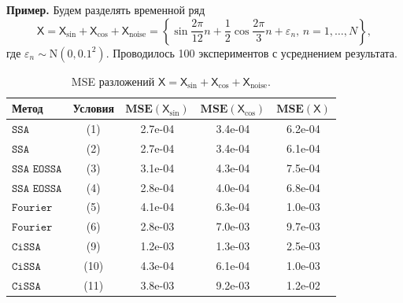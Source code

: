\documentclass[12pt, specialist, subf
]{disser}
\theoremstyle{definition}
\newcommand{\SSA}{\texttt{SSA}}
\newcommand{\EOSSA}{\texttt{SSA EOSSA}}
\newcommand{\CISSA}{\texttt{CiSSA}}
\newcommand{\FOURIER}{\texttt{Fourier}}
\newcommand{\TS}{\mathsf{X}}
\newcommand{\MSE}{\textbf{MSE}}
\begin{document}
\textbf{\large{Пример.}} Будем разделять временной ряд 
\[
\TS = \TS_{\sin} + \TS_{\cos} + \TS_{\mathrm{noise}} =  \left\{ \sin{\frac{2\pi}{12}n} + \frac{1}{2}\cos{\frac{2\pi}{3}n}+ \varepsilon_n, \, n = 1, \dots, N \right\},
\]
где $\varepsilon_n \sim \mathrm N(0, 0.1^2)$. Проводилось 100 экспериментов с усреднением результата.

\begin{table}[H]
\centering
\caption{MSE разложений \(\TS = \TS_{\sin} + \TS_{\cos}+ \TS_{\mathrm{noise}}\).}
\label{tab:exact_noised_results}
\begin{tabular}{l|c|ccc}
  \hline
  \textbf{Метод} & \textbf{Условия} & \(\MSE(\TS_{\sin})\) & \(\MSE(\TS_{\cos})\) & \(\MSE(\TS)\) \\ 
  \hline
  $\SSA$    & (1) & 2.7e-04 & 3.4e-04 & 6.2e-04 \\ 
  $\SSA$    & (2) & 2.7e-04 & 3.4e-04 & 6.1e-04 \\ 
  \hline
  $\EOSSA$  & (3) & 3.1e-04 & 4.3e-04 & 7.5e-04 \\ 
  $\EOSSA$  & (4) & 2.8e-04 & 4.0e-04 & 6.8e-04 \\ 
  \hline
  $\FOURIER$    & (5) & 4.1e-04 & 6.3e-04 & 1.0e-03 \\ 
  $\FOURIER$ & (6) & 2.8e-03 & 7.0e-03 & 9.7e-03 \\ 
  \hline
  $\CISSA$  & (9) & 1.2e-03 & 1.3e-03 & 2.5e-03 \\ 
  $\CISSA$ & (10) & 4.3e-04 & 6.1e-04 & 1.0e-03 \\ 
  $\CISSA$ & (11) & 3.8e-03 & 9.2e-03 & 1.2e-02 \\ 
  \hline
\end{tabular}
\end{table}
\end{document}
